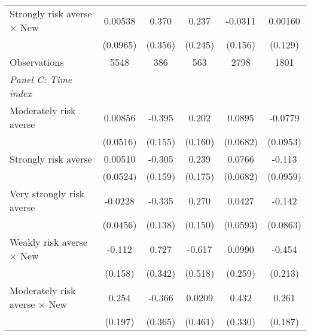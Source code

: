 {\begin{longtable}{l*{5}{c}}
Strongly risk averse $\times$ New&     0.00538         &       0.370         &       0.237         &     -0.0311         &     0.00160         \\
                    &    (0.0965)         &     (0.356)         &     (0.245)         &     (0.156)         &     (0.129)         \\
\midrule
Observations        &        5548         &         386         &         563         &        2798         &        1801         \\


\midrule
\textit{Panel C: Time index} & & & & & \\
Moderately risk averse&     0.00856         &      -0.395\sym{**} &       0.202         &      0.0895         &     -0.0779         \\
                    &    (0.0516)         &     (0.155)         &     (0.160)         &    (0.0682)         &    (0.0953)         \\

Strongly risk averse&     0.00510         &      -0.305\sym{*}  &       0.239         &      0.0766         &      -0.113         \\
                    &    (0.0524)         &     (0.159)         &     (0.175)         &    (0.0682)         &    (0.0959)         \\

Very strongly risk averse&     -0.0228         &      -0.335\sym{**} &       0.270\sym{*}  &      0.0427         &      -0.142         \\
                    &    (0.0456)         &     (0.138)         &     (0.150)         &    (0.0593)         &    (0.0863)         \\

Weakly risk averse $\times$ New&      -0.112         &       0.727\sym{**} &      -0.617         &      0.0990         &      -0.454\sym{**} \\
                    &     (0.158)         &     (0.342)         &     (0.518)         &     (0.259)         &     (0.213)         \\

Moderately risk averse $\times$ New&       0.254         &      -0.366         &      0.0209         &       0.432         &       0.261         \\
                    &     (0.197)         &     (0.365)         &     (0.461)         &     (0.330)         &     (0.187)         \\


\end{longtable}}

